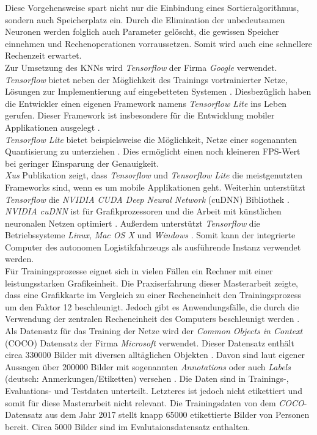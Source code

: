 		Diese Vorgehensweise spart nicht nur die Einbindung eines Sortieralgorithmus, sondern auch Speicherplatz ein. Durch die Elimination der unbedeutsamen Neuronen werden folglich auch Parameter gelöscht, die gewissen Speicher einnehmen und Rechenoperationen vorraussetzen. Somit wird auch eine schnellere Rechenzeit erwartet. \\
		
		Zur Umsetzung des KNNs wird \textit{Tensorflow} der Firma \textit{Google} verwendet. \textit{Tensorflow} bietet neben der Möglichkeit des Trainings vortrainierter Netze, Lösungen zur Implementierung auf eingebetteten Systemen \cite{frameworks}. Diesbezüglich haben die Entwickler einen eigenen Framework namens \textit{Tensorflow Lite} ins Leben gerufen. Dieser Framework ist insbesondere für die Entwicklung mobiler Applikationen ausgelegt \cite{tflite}.\\
		
		\textit{Tensorflow Lite} bietet beispielsweise die Möglichkeit, Netze einer sogenannten Quantisierung zu unterziehen \cite{tflite}. Dies ermöglicht einen noch kleineren FPS-Wert bei geringer Einsparung der Genauigkeit.\\
		
		\textit{Xus} Publikation zeigt, dass \textit{Tensorflow} und \textit{Tensorflow Lite} die meistgenutzten Frameworks sind, wenn es um mobile Applikationen geht. Weiterhin unterstützt \textit{Tensorflow} die \textit{NVIDIA CUDA Deep Neural Network} (cuDNN) Bibliothek \cite{frameworks}. \textit{NVIDIA cuDNN} ist für Grafikprozessoren und die Arbeit mit künstlichen neuronalen Netzen optimiert \cite{frameworks}. Außerdem unterstützt \textit{Tensorflow} die Betriebssysteme \textit{Linux}, \textit{Mac OS X} und \textit{Windows} \cite{frameworks}. Somit kann der integrierte Computer des autonomen Logistikfahrzeugs als ausführende Instanz verwendet werden.\\
		
		Für Trainingsprozesse eignet sich in vielen Fällen ein Rechner mit einer leistungsstarken Grafikeinheit. Die Praxiserfahrung dieser Masterarbeit zeigte, dass eine Grafikkarte im Vergleich zu einer Recheneinheit den Trainingsprozess um den Faktor 12 beschleunigt. Jedoch gibt es Anwendungsfälle, die durch die Verwendung der zentralen Recheneinheit des Computers beschleunigt werden \cite{cpugpu}. \\
		
		Als Datensatz für das Training der Netze wird der \textit{Common Objects in Context} (COCO) Datensatz der Firma \textit{Microsoft} verwendet. Dieser Datensatz enthält circa 330000 Bilder mit diversen alltäglichen Objekten \cite{coco, cocopaper}. Davon sind laut eigener Aussagen über 200000 Bilder mit sogenannten \textit{Annotations} oder auch \textit{Labels} (deutsch: Anmerkungen/Etiketten) versehen \cite{coco}. Die Daten sind in Trainings-, Evaluations- und Testdaten unterteilt. Letzteres ist jedoch nicht etikettiert und somit für diese Masterarbeit nicht relevant. Die Trainingsdaten von dem \textit{COCO}-Datensatz aus dem Jahr 2017 stellt knapp 65000 etikettierte Bilder von Personen bereit. Circa 5000 Bilder sind im Evalutaionsdatensatz enthalten.\\
		
